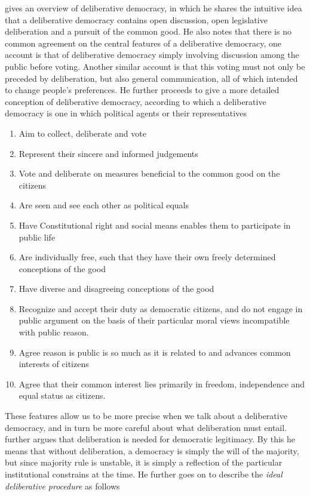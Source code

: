 \citet{Freeman_2000} gives an overview of deliberative democracy, in which he shares the intuitive idea that a deliberative democracy contains open discussion, open legislative deliberation and a pursuit of the common good. He also notes that there is no common agreement on the central features of a deliberative democracy, one account is that of deliberative democracy simply involving discussion among the public before voting. Another similar account is that this voting must not only be preceded by deliberation, but also general communication, all of which intended to change people's preferences. He further proceeds to give a more detailed conception of deliberative democracy, according to which a deliberative democracy is one in which political agents or their representatives
\begin{enumerate}
	\label{list:deliberative-democracy}
	\setlength\itemsep{1px}
	\item  Aim to collect, deliberate and vote
	\item  Represent their sincere and informed judgements
	\item  Vote and deliberate on measures beneficial to the common good on the citizens
	\item  Are seen and see each other as political equals
	\item  Have Constitutional right and social means enables them to participate in public life
	\item  Are individually free, such that they have their own freely determined conceptions of the good
	\item  Have diverse and disagreeing conceptions of the good
	\item  Recognize and accept their duty as democratic citizens, and do not engage in public argument on the basis of their particular moral views incompatible with public reason.
	\item  Agree reason is public is so much as it is related to and advances common interests of citizens
	\item  Agree that their common interest lies primarily in freedom, independence and equal status as citizens.
\end{enumerate}

These features allow us to be more precise when we talk about a deliberative democracy, and in turn be more careful about what deliberation must entail. \citet{Cohen_2002} further argues that deliberation is needed for democratic legitimacy. By this he means that without deliberation, a democracy is simply the will of the majority, but since majority rule is unstable, it is simply a reflection of the particular institutional constrains at the time. He further goes on to describe the \textit{ideal deliberative procedure} as follows

